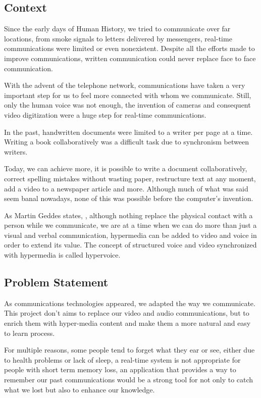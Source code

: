 \subsection{Context}   %
 	Since the early days of Human History, we tried to communicate over far locations, from smoke signals to letters delivered by messengers, real-time communications were limited or even nonexistent. Despite all the efforts made to improve communications, written communication could never replace face to face communication.

	With the advent of the telephone network, communications have taken a very important step for us to feel more connected with whom we communicate. Still, only the human voice was not enough, the invention of cameras and consequent video digitization were a huge step for real-time communications.

	In the past, handwritten documents were limited to a writer per page at a time. Writing a book collaboratively was a difficult task due to synchronism between writers.

	Today, we can achieve more, it is possible to write a document collaboratively, correct spelling mistakes without wasting paper, restructure text at any moment, add a video to a newspaper article and more. Although much of what was said seem banal nowadays, none of this was possible before the computer's invention. 

	As Martin Geddes\cite{geddes} states,  , although nothing replace the physical contact with a person while we communicate, we are at a time when we can do more than just a visual and verbal communication, hypermedia can be added to video and voice in order to extend its value. The concept of structured voice and video synchronized with hypermedia is called hypervoice.

\subsection{Problem Statement} %

	As communications technologies appeared, we adapted the way we communicate. This project don't aims to replace our video and audio communications, but to enrich them with hyper-media content and make them a more natural and easy to learn process. 

	For multiple reasons, some people tend to forget what they ear or see, either due to health problems or lack of sleep, a real-time system is not appropriate for people with short term memory loss, an application that provides a way to remember our past communications would be a strong tool for not only to catch what we lost but also to enhance our knowledge.

